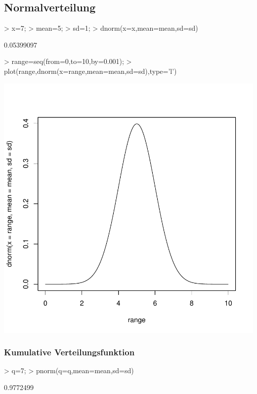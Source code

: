 \subsection{Normalverteilung}
\begin{Schunk}
\begin{Sinput}
> x=7;
> mean=5;
> sd=1;
> dnorm(x=x,mean=mean,sd=sd)
\end{Sinput}
\begin{Soutput}
[1] 0.05399097
\end{Soutput}
\begin{Sinput}
> range=seq(from=0,to=10,by=0.001);
> plot(range,dnorm(x=range,mean=mean,sd=sd),type='l')
\end{Sinput}
\end{Schunk}
\includegraphics{definitionen-019}

\subsubsection{Kumulative Verteilungsfunktion}
\begin{Schunk}
\begin{Sinput}
> q=7;
> pnorm(q=q,mean=mean,sd=sd)
\end{Sinput}
\begin{Soutput}
[1] 0.9772499
\end{Soutput}
\end{Schunk}

